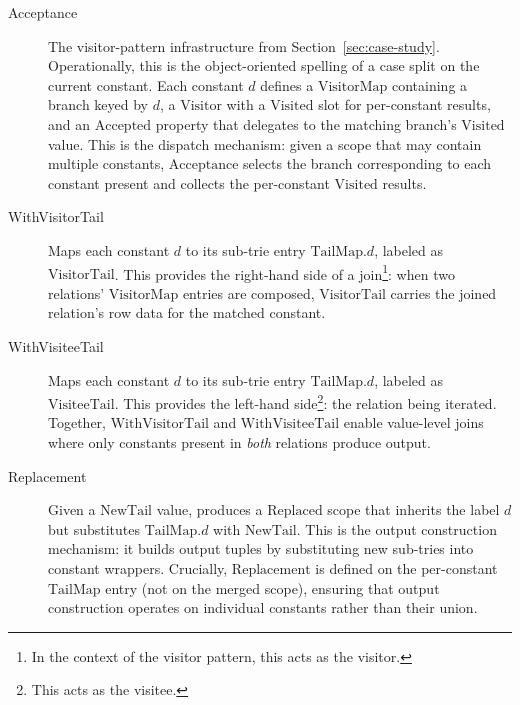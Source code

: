 \begin{description}
  \item[Acceptance]
    The visitor-pattern infrastructure from
    Section~\ref{sec:case-study}.
    Operationally, this is the object-oriented spelling of a
    case split on the current constant.
    Each constant $d$ defines a $\mathrm{VisitorMap}$
    containing a branch keyed by $d$, a $\mathrm{Visitor}$
    with a $\mathrm{Visited}$ slot for per-constant results,
    and an $\mathrm{Accepted}$ property that delegates to the
    matching branch's $\mathrm{Visited}$ value.
    This is the dispatch mechanism: given a scope that may
    contain multiple constants, $\mathrm{Acceptance}$ selects the
    branch corresponding to each constant present and
    collects the per-constant $\mathrm{Visited}$ results.

  \item[WithVisitorTail]
    Maps each constant $d$ to its sub-trie entry
    $\mathrm{TailMap}.d$, labeled as $\mathrm{VisitorTail}$.
    This provides the right-hand side of a join\footnote{
      In the context of the visitor pattern, this acts as the visitor.
    }: when two relations' $\mathrm{VisitorMap}$ entries are
    composed, $\mathrm{VisitorTail}$ carries the joined
    relation's row data for the matched constant.

  \item[WithVisiteeTail]
    Maps each constant $d$ to its sub-trie entry
    $\mathrm{TailMap}.d$, labeled as $\mathrm{VisiteeTail}$.
    This provides the left-hand side\footnote{
      This acts as the visitee.
    }: the
    relation being iterated. Together,
    $\mathrm{WithVisitorTail}$ and $\mathrm{WithVisiteeTail}$
    enable value-level joins where only constants present
    in \emph{both} relations produce output.

  \item[Replacement]
    Given a $\mathrm{NewTail}$ value, produces a
    $\mathrm{Replaced}$ scope that inherits the label $d$
    but substitutes $\mathrm{TailMap}.d$ with
    $\mathrm{NewTail}$.
    This is the output construction mechanism: it
    builds output tuples by substituting new sub-tries into
    constant wrappers.
    Crucially, $\mathrm{Replacement}$ is defined on the
    per-constant $\mathrm{TailMap}$ entry (not on the merged
    scope), ensuring that output construction operates on
    individual constants rather than their union.
\end{description}

